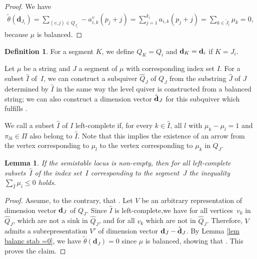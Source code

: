 \documentclass[pdftex]{sigma}
\numberwithin{equation}{section}
\newtheorem{Lemma}[Theorem]{Lemma}
\theoremstyle{definition}
\newtheorem{Definition}[Theorem]{Definition}
\begin{document}
\begin{proof}We have
\begin{align*}
\tilde{\theta} (\mathbf{d}_{J_i})= \sum_{(v,j) \in Q_{J_i}} - a_{i,k}^v (p_j+j) = \sum_{j=1}^{k_i} a_{i,k} (p_j+j) = \sum_{k \in \tilde{J}_i} \mu_k =0 ,
\end{align*}
because $\mu$ is balanced.
\end{proof}

\begin{Definition}For a segment $K$, we define $Q_K=Q_i$ and ${\bf d}_K={\bf d}_i$ if $K=J_i$.

Let $\mu$ be a string and $J$ a segment of $\mu$ with corresponding index set $I$. For a subset $\hat{I}$ of~$I$, we can construct a subquiver $\hat{Q}_J$ of $Q_J$ from the substring $\hat{J}$ of $J$ determined by $\hat{I}$ in the same way the level quiver is constructed from a balanced string; we can also construct a dimension vector $\hat{{\bf d}}_J$ for this subquiver which fulfills .

We call a subset $\hat{I}$ of $I$ left-complete if, for every $k \in \hat{I}$, all $l$ with $\mu_k -\mu_l =1$ and $\pi_{lk} \in \Pi$ also belong to $\hat{I}$. Note that this implies the existence of an arrow from the vertex corresponding to $\mu_l$ to the vertex corresponding to $\mu_k$ in $Q_J$.
\end{Definition}

\begin{Lemma} \label{lem inequ for left-complete}
If the semistable locus  is non-empty, then for all left-complete subsets~$\hat{I}$ of the index set~$I$ corresponding to the segment~$J$ the inequality
$\sum_{\hat{I}} \mu_i \leq 0$
holds.
\end{Lemma}
\begin{proof}Assume, to the contrary, that . Let $V$ be an arbitrary representation of dimension vector ${\bf d}_J$ of $Q_J$. Since $\hat{I}$ is left-complete,we have  for all vertices~$v_k$ in $\hat{Q}_J$, which are not a sink in $\hat{Q}_J$, and  for all $v_k$ which are not in $\hat{Q}_J$. Therefore, $V$ admits a subrepresentation $V'$ of dimension vector ${\bf d}_J -\hat{\bf d}_J$. By Lemma \ref{lem balanc stab =0}, we have $\tilde{\theta} (\mathbf{d}_J) = 0$ since $\mu$ is balanced, showing that . This proves the claim.
\end{proof}
\end{document}

